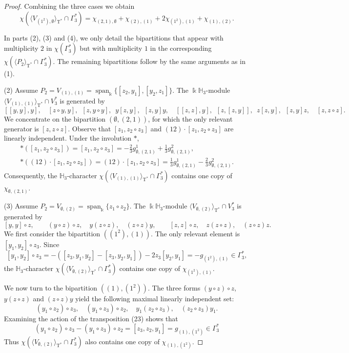 \documentclass{amsart}
\theoremstyle{definition}
\theoremstyle{remark}
\numberwithin{equation}{section}
\newcommand{\lr}[1]{\langle #1 \rangle}
\def \Ga{\Gamma}
\def \k{\Bbbk}
\def \H{\mathbb{H}}
\def \sp{\operatorname{span}}
\def \T{\operatorname{T}}
\def \es{\emptyset}
\begin{document}
\begin{proof}
	Combining the three cases we obtain
	\[
	\chi({\lr{V_{(1^2), \es}}_{\T^*} \cap \Ga_3^*}) = \chi_{(2,1),\es} +\chi_{(2),(1)} + 2\chi_{(1^2),(1)} + \chi_{(1),(2)}.
	\] 
	
	In parts (2), (3) and (4), we only detail the bipartitions that appear with multiplicity $2$ in $\chi(\Ga_3^*)$ but with multiplicity $1$ in the corresponding $\chi(\langle P_2\rangle_{\T^*} \cap \Ga_3^*)$. The remaining bipartitions follow by the same arguments as in (1).
	
	(2) Assume $P_2 = V_{(1), (1)} = \sp_\k \{[z_2,y_1], [y_2,z_1] \}$. The $\k\H_3$-module $\lr{V_{(1),(1)}}_{\T^*} \cap V_3^*$ is generated by
	\[
	[[y,y],y],\enspace\enspace [z\circ y,y],\enspace [z,y\circ y],\enspace y[z,y],\enspace [z,y]y,\enspace\enspace [[z,z],y],\enspace [z,[z,y]],\enspace  z[z,y],\enspace  [z,y]z,\enspace\enspace [z,z\circ z].
	\] 
	We concentrate on the bipartition $(\es, (2,1))$, for which the only relevant generator is $[z,z\circ z]$. Observe that $[z_1,z_2\circ z_3]$ and $(12)\cdot [z_1,z_2\circ z_3]$ are linearly independent. Under the involution $*$,
	\begin{align*}
	*([z_1,z_2\circ z_3])=[z_1,z_2\circ z_3]=-\frac{2}{3}g_{\es,(2,1)}^1+\frac{1}{3}g_{\es,(2,1)}^2,\\
	*((12)\cdot [z_1,z_2\circ z_3])=(12)\cdot [z_1,z_2\circ z_3]=\frac{1}{3}g_{\es,(2,1)}^1-\frac{2}{3}g_{\es,(2,1)}^2.
	\end{align*}
	Consequently, the $\H_3$-character $\chi(\lr{V_{(1),(1)}}_{\T^*} \cap \Ga_3^*)$ contains one copy of $\chi_{\es,(2,1)}$.
	
	(3) Assume $P_2 = V_{\es, (2)} = \sp_\k \{z_1 \circ z_2 \}$. The $\k\H_3$-module $\lr{V_{\es, (2)}}_{\T^*} \cap V_3^*$ is generated by 
	\[
	[y,y]\circ z,\qquad (y\circ z)\circ z,\quad y(z\circ z),\quad (z\circ z)y,\qquad [z,z]\circ z,\quad z(z\circ z),\quad (z\circ z)z.
	\] 
	We first consider the bipartition $((1^2), (1))$. The only relevant element is $[y_1,y_2] \circ z_3$. Since
	\[
	[y_1,y_2]\circ z_3=-([z_3,y_1,y_2]-[z_3,y_2,y_1])-2z_3[y_2,y_1]= -g_{(1^2),(1)} \in \Ga_3^*,
	\]
	the $\H_3$-character $\chi(\lr{V_{\es, (2)}}_{\T^*} \cap \Ga_3^*)$ contains one copy of $\chi_{(1^2),(1)}$.
	
	We now turn to the bipartition $((1), (1^2))$. The three forms $(y\circ z)\circ z$, $y(z\circ z)$ and $(z\circ z)y$ yield the following maximal linearly independent set:
	\[
	(y_1\circ z_2)\circ z_3, \quad (y_1\circ z_3)\circ z_2, \quad y_1(z_2\circ z_3), \quad (z_2\circ z_3)y_1.
	\]
	Examining the action of the transposition (23) shows that
	\[
	(y_1\circ z_2)\circ z_3-(y_1\circ z_3)\circ z_2=[z_3,z_2,y_1] = g_{(1),(1^2)} \in \Ga_3^*
	\]
	Thus $\chi(\lr{V_{\es, (2)}}_{\T^*} \cap \Ga_3^*)$ also  contains one copy of $\chi_{(1),(1^2)}$.
	

\end{proof}
\end{document}
